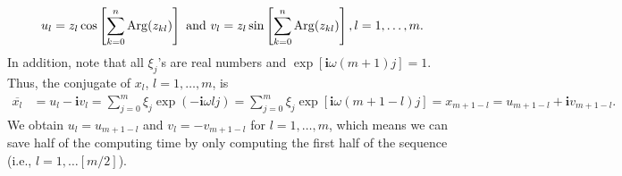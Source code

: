 \documentclass[12pt]{article}
\newcommand{\Arg}{{\rm Arg}}
\newcommand{\ivec}{{\boldsymbol{i}}}
\begin{document}
\begin{align}\label{eqn:al.bl}
u_l=z_l\cos\left[\sum_{k=0}^n\Arg(z_{kl})\right]\text{ and }v_l=z_l\sin\left[\sum_{k=0}^n\Arg(z_{kl})\right], l=1,\dots,m.
\end{align}
In addition, note that all $\xi_j$'s are real numbers and $\exp[\ivec\omega(m+1)j]=1$. Thus, the conjugate of $x_l$,  $l=1,\dots,m$, is
\begin{align*}
\overline{x_l}&=u_l-\ivec v_l=\sum_{j=0}^m\xi_j\exp(-\ivec\omega lj)=\sum_{j=0}^m\xi_j\exp[\ivec\omega(m+1-l)j]=x_{m+1-l}=u_{m+1-l}+\ivec v_{m+1-l}.
\end{align*}
We obtain $u_l=u_{m+1-l}$ and $v_l=-v_{m+1-l}$ for $l=1,\dots,m$, which means we can save half of the computing time by only computing the first half of the sequence (i.e., $l=1,\dots [m/2]$).




\end{document}
